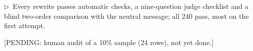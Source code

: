 \documentclass[11pt]{article}
\newcommand{\flow}[1]{\par\noindent\textcolor{blue!60!black}{\small$\triangleright$\ #1}\par\medskip}
\newcommand{\pending}[1]{\par\noindent\textcolor{orange!80!black}{\small[PENDING: #1]}\par\medskip}
\begin{document}
\flow{Every rewrite passes automatic checks, a nine-question judge checklist and a blind two-order comparison with the neutral message; all 240 pass, most on the first attempt.}
\pending{human audit of a 10\% sample (24 rows), not yet done.}
\end{document}
